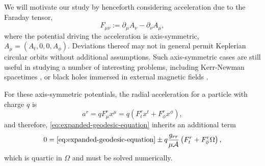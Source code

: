 We will motivate our study by henceforth considering acceleration due to the
Faraday tensor,
\begin{equation}
    F_{\mu\nu} := \partial_\mu A_\nu - \partial_\nu A_\mu,
\end{equation}
where the potential driving the acceleration is axis-symmetric, $A_\mu = (A_t,
0, 0, A_\phi)$. Deviations thereof may not in general permit Keplerian circular
orbits without additional assumptions. Such axis-symmetric cases are still
useful in studying a number of interesting problems, including Kerr-Newman
spacetimes \citep{hackmann_charged_2013}, or black holes immersed in external
magnetic fields \citep{tursunov_circular_2016}.

For these axis-symmetric potentials, the radial acceleration for a particle with charge $q$ is
\begin{equation}
    a^r = qF^r_\mu x^\mu = q\left( F^r_t x^t + F^r_\phi x^\phi\right),
\end{equation}
and therefore, \eqref{eq:expanded-geodesic-equation} inherits an additional term
\begin{equation}
    0 = \textrm{\eqref{eq:expanded-geodesic-equation}} \pm q \frac{g_{rr}}{\mu \mathcal{A}} \left( F^r_t + F^r_\phi \Omega \right),
\end{equation}
which is quartic in $\Omega$ and must be solved numerically.



